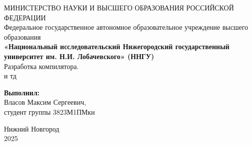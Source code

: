 \documentclass[a4paper,14pt]{extarticle}
\begin{document}
\begin{titlepage}
  \begin{center}
    МИНИСТЕРСТВО НАУКИ И ВЫСШЕГО ОБРАЗОВАНИЯ РОССИЙСКОЙ ФЕДЕРАЦИИ\\
    Федеральное государственное автономное образовательное учреждение высшего образования\\
    \textbf{«Национальный исследовательский Нижегородский государственный университет им. Н.И. Лобачевского» (ННГУ)}\\
    \vspace*{\fill}
    {\LARGE Разработка компилятора.\\и тд}\\
    \vspace{2cm}
  \end{center}
  \hfill
  \begin{minipage}{0.4\textwidth}
    \raggedright
    \textbf{Выполнил:}\\
    Власов Максим Сергеевич,\\
    студент группы 3823М1ПМкн\\
  \end{minipage}
  \vspace*{\fill}
  \begin{center}
    Нижний Новгород\\
    2025
  \end{center}
\end{titlepage}

\newpage
\setcounter{page}{2}
\tableofcontents











\newpage
{}
\printbibliography
\end{document}
